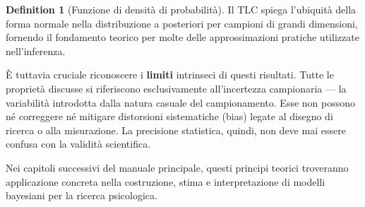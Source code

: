 \documentclass[
  letterpaper,
  DIV=11,
  numbers=noendperiod,
  oneside]{scrreprt}
\theoremstyle{definition}
\theoremstyle{plain}
\theoremstyle{definition}
\newtheorem{definition}{Definition}[chapter]
\theoremstyle{remark}
\begin{document}
\begin{definition}[Funzione di densità di
probabilità]
Il TLC spiega l'ubiquità della forma normale nella distribuzione a
posteriori per campioni di grandi dimensioni, fornendo il fondamento
teorico per molte delle approssimazioni pratiche utilizzate
nell'inferenza.

È tuttavia cruciale riconoscere i \textbf{limiti} intrinseci di questi
risultati. Tutte le proprietà discusse si riferiscono esclusivamente
all'incertezza campionaria --- la variabilità introdotta dalla natura
casuale del campionamento. Esse non possono né correggere né mitigare
distorsioni sistematiche (bias) legate al disegno di ricerca o alla
misurazione. La precisione statistica, quindi, non deve mai essere
confusa con la validità scientifica.

Nei capitoli successivi del manuale principale, questi principi teorici
troveranno applicazione concreta nella costruzione, stima e
interpretazione di modelli bayesiani per la ricerca psicologica.

\begin{tcolorbox}[enhanced jigsaw, arc=.35mm, breakable, colbacktitle=quarto-callout-note-color!10!white, opacityback=0, toprule=.15mm, rightrule=.15mm, colback=white, opacitybacktitle=0.6, leftrule=.75mm, coltitle=black, bottomtitle=1mm, left=2mm, toptitle=1mm, title=\textcolor{quarto-callout-note-color}{\faInfo}\hspace{0.5em}{Informazioni sull'ambiente di sviluppo}, titlerule=0mm, bottomrule=.15mm, colframe=quarto-callout-note-color-frame]


\end{tcolorbox}
\end{definition}
\end{document}
